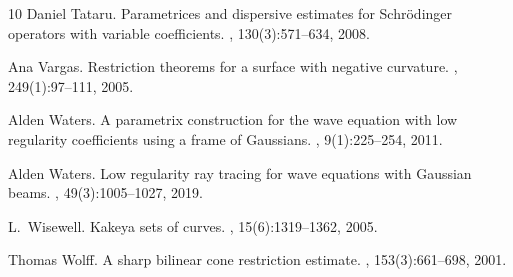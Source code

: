 \documentclass{amsart}
\theoremstyle{definition}
\begin{document}
\begin{thebibliography}{10}
Daniel Tataru.
\newblock Parametrices and dispersive estimates for {S}chr\"odinger operators
  with variable coefficients.
, 130(3):571--634, 2008.

Ana Vargas.
\newblock Restriction theorems for a surface with negative curvature.
, 249(1):97--111, 2005.

Alden Waters.
\newblock A parametrix construction for the wave equation with low regularity
  coefficients using a frame of {Gaussians}.
, 9(1):225--254, 2011.

Alden Waters.
\newblock Low regularity ray tracing for wave equations with {Gaussian} beams.
, 49(3):1005--1027, 2019.

L.~Wisewell.
\newblock Kakeya sets of curves.
, 15(6):1319--1362, 2005.

Thomas Wolff.
\newblock A sharp bilinear cone restriction estimate.
, 153(3):661--698, 2001.

\end{thebibliography}
\end{document}
